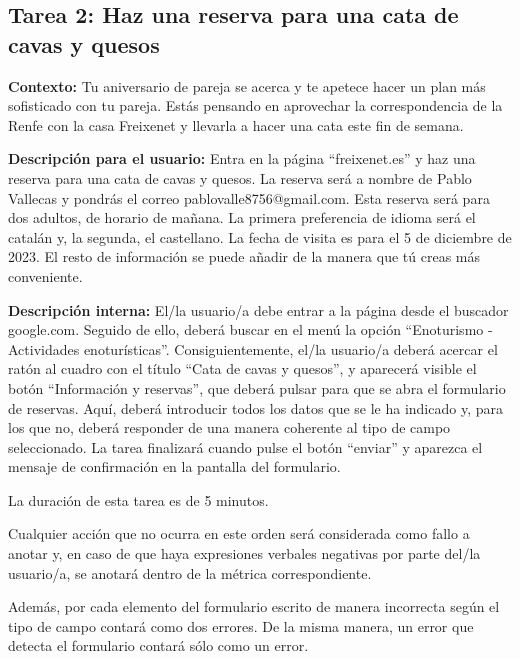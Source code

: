 \documentclass[spanish]{article}
\begin{document}
\subsection{Tarea 2: Haz una reserva para una cata de cavas
y quesos}

\textbf{Contexto:} Tu aniversario de pareja se acerca y te apetece hacer
un plan más sofisticado con tu pareja. Estás pensando en
aprovechar la correspondencia de la Renfe con la casa
Freixenet y llevarla a hacer una cata este fin de
semana.\newline

\textbf{Descripción para el usuario:} Entra en la página
``freixenet.es'' y haz una reserva para una cata de cavas y
quesos. La reserva será a nombre de Pablo Vallecas y pondrás
el correo pablovalle8756@gmail.com. Esta reserva será para
dos adultos, de horario de mañana. La primera preferencia
de idioma será el catalán y, la segunda, el castellano. La
fecha de visita es para el 5 de diciembre de 2023. El resto
de información se puede añadir de la manera que tú creas más
conveniente.\newline

\textbf{Descripción interna:} El/la usuario/a debe entrar a
la página desde el buscador google.com. Seguido de ello,
deberá buscar en el menú la opción ``Enoturismo -
Actividades enoturísticas''. Consiguientemente, el/la
usuario/a deberá acercar el ratón al cuadro con el título
``Cata de cavas y quesos'', y aparecerá visible el botón
``Información y reservas'', que deberá pulsar para que se
abra el formulario de reservas. Aquí, deberá introducir
todos los datos que se le ha indicado y, para los que no,
deberá responder de una manera coherente al tipo de campo
seleccionado. La tarea finalizará cuando pulse el botón
``enviar'' y aparezca el mensaje de confirmación en la
pantalla del formulario.\newline

La duración de esta tarea es de 5 minutos.\newline

Cualquier acción que no ocurra en este orden será
considerada como fallo a anotar y, en caso de que haya
expresiones verbales negativas por parte del/la usuario/a,
se anotará dentro de la métrica correspondiente.\newline

Además, por cada elemento del formulario escrito de manera
incorrecta según el tipo de campo contará como dos errores.
De la misma manera, un error que detecta el formulario
contará sólo como un error.\newline
\end{document}
